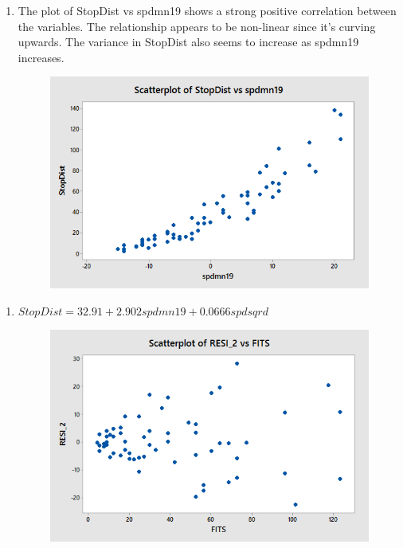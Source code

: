 \documentclass{article}
\providecommand{\tightlist}{%
      \setlength{\itemsep}{0pt}\setlength{\parskip}{0pt}}
\begin{document}
\begin{enumerate}
\def\labelenumi{\alph{enumi})}
\tightlist
\item
  The plot of StopDist vs spdmn19 shows a strong positive correlation
  between the variables. The relationship appears to be non-linear since
  it's curving upwards. The variance in StopDist also seems to increase
  as spdmn19 increases.
  
\begin{figure}[h!]
 \centering
 \includegraphics[scale=.5]{./images/scatterplot_StopDist-vs-spdmn19.png}
\end{figure}

\end{enumerate}

\begin{enumerate}
\def\labelenumi{\alph{enumi})}
\setcounter{enumi}{1}
\tightlist
\item
  \(StopDist = 32.91 + 2.902 spdmn19 + 0.0666 spdsqrd\)
  
  \begin{figure}[h!]
 \centering
 \includegraphics[scale=.5]{./images/plot-residuals-vs-fits_stopDist-vs-spdmn19-and-spdsqrd.png}
\end{figure}

\end{enumerate}
\end{document}
